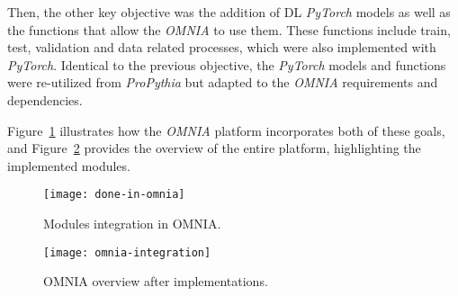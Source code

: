 Then, the other key objective was the addition of \gls{DL} \textit{PyTorch} models as well as the functions that allow the \textit{OMNIA} to use them. These functions include train, test, validation and data related processes, which were also implemented with \textit{PyTorch}. Identical to the previous objective, the \textit{PyTorch} models and functions were re-utilized from \textit{ProPythia} but adapted to the \textit{OMNIA} requirements and dependencies.

Figure~\ref{fig:done-in-omnia} illustrates how the \textit{OMNIA} platform incorporates both of these goals, and Figure~\ref{fig:omnia-integration} provides the overview of the entire platform, highlighting the implemented modules.

\begin{figure}[htbp]
    \centering
    \texttt{[image: done-in-omnia]}
    \caption{Modules integration in OMNIA.}
    \label{fig:done-in-omnia}
\end{figure}

\begin{figure}[htbp]
    \centering
    \texttt{[image: omnia-integration]}
    \caption{OMNIA overview after implementations.}
    \label{fig:omnia-integration}
\end{figure}






